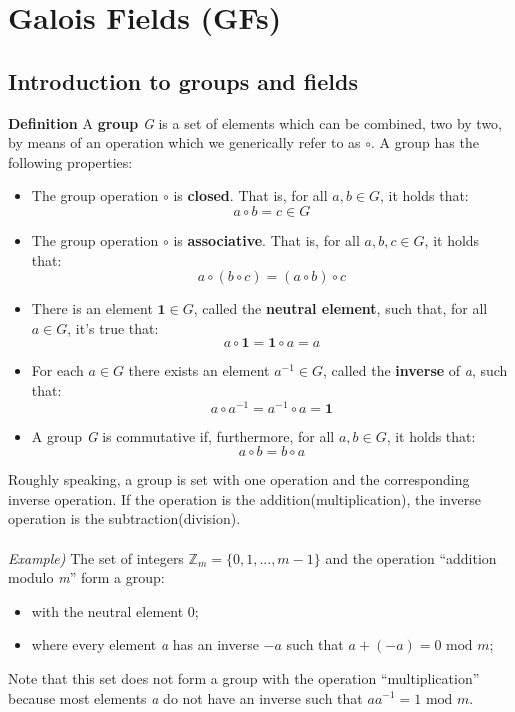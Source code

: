 \documentclass[11pt, a4paper]{article}
\newcommand{\doublequotes}[1]{“#1”}
\newcommand{\idElement}{
    \textbf{1}
}
\newcommand{\mymod}{
    \text{ mod }
}
\begin{document}
\newpage
\section{Galois Fields (GFs)}
\subsection{Introduction to groups and fields}
\begin{framed}
\hfill\break\textbf{Definition} A \textbf{group} \textit{G} is a set of elements which can be combined, two by two, by means of an operation which we generically refer to as $\circ$. A group has the following properties:
\begin{itemize}
    \item The group operation $\circ$ is \textbf{closed}. That is, for all $a,b\in G$, it holds that:
    $$a\circ b=c\in G$$
    \item The group operation $\circ$ is \textbf{associative}. That is, for all $a,b,c\in G$, it holds that:
    $$a\circ(b\circ c)=(a\circ b)\circ c$$
    \item There is an element $\idElement\in G$, called the \textbf{neutral element}, such that, for all $a\in G$, it's true that:
    $$a\circ\idElement=\idElement\circ a=a$$
    \item For each $a\in G$ there exists an element $a^{-1}\in G$, called the \textbf{inverse} of \textit{a}, such that:
    $$a\circ a^{-1}=a^{-1}\circ a=\idElement$$
    \item A group \textit{G} is commutative if, furthermore, for all $a,b\in G$, it holds that:
    $$a\circ b=b\circ a$$
\end{itemize}
\end{framed}
Roughly speaking, a group is set with one operation and the corresponding inverse operation. If the operation is the addition(multiplication), the inverse operation is the subtraction(division).\\\\
\textit{Example)} The set of integers $\mathbb{Z}_m=\{0,1,...,m-1\}$ and the operation \doublequotes{addition modulo \textit{m}} form a group:
\begin{itemize}
    \item with the neutral element 0;
    \item where every element \textit{a} has an inverse $-a$ such that $a+(-a)=0\mymod m$;
\end{itemize}
Note that this set does not form a group with the operation \doublequotes{multiplication} because most elements \textit{a} do not have an inverse such that $aa^{-1}=1\mymod m$.\\\\
\end{document}
